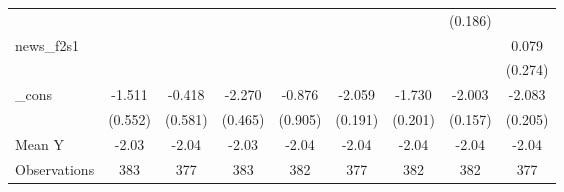 {\begin{tabular}{l*{8}{c}}
            &                     &                     &                     &                     &                     &                     &     (0.186)         &                     \\
\addlinespace
news\_f2s1   &                     &                     &                     &                     &                     &                     &                     &       0.079         \\
            &                     &                     &                     &                     &                     &                     &                     &     (0.274)         \\
\addlinespace
\_cons      &      -1.511\sym{**} &      -0.418         &      -2.270\sym{***}&      -0.876         &      -2.059\sym{***}&      -1.730\sym{***}&      -2.003\sym{***}&      -2.083\sym{***}\\
            &     (0.552)         &     (0.581)         &     (0.465)         &     (0.905)         &     (0.191)         &     (0.201)         &     (0.157)         &     (0.205)         \\
\midrule
Mean Y      &       -2.03         &       -2.04         &       -2.03         &       -2.04         &       -2.04         &       -2.04         &       -2.04         &       -2.04         \\
Observations&         383         &         377         &         383         &         382         &         377         &         382         &         382         &         377         \\
\bottomrule
\end{tabular}
}
